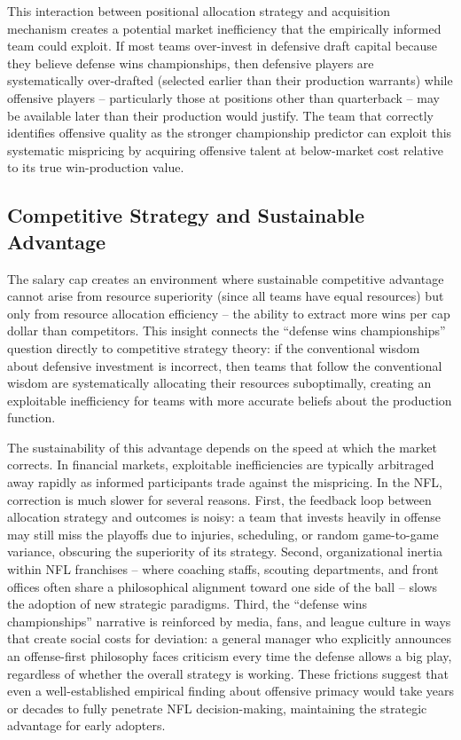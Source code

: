 This interaction between positional allocation strategy and acquisition mechanism creates a potential market inefficiency that the empirically informed team could exploit. If most teams over-invest in defensive draft capital because they believe defense wins championships, then defensive players are systematically over-drafted (selected earlier than their production warrants) while offensive players  -- particularly those at positions other than quarterback  -- may be available later than their production would justify. The team that correctly identifies offensive quality as the stronger championship predictor can exploit this systematic mispricing by acquiring offensive talent at below-market cost relative to its true win-production value.

\subsection{Competitive Strategy and Sustainable Advantage}
\label{sec:competitive-strategy}

The salary cap creates an environment where sustainable competitive advantage cannot arise from resource superiority (since all teams have equal resources) but only from resource allocation efficiency  -- the ability to extract more wins per cap dollar than competitors. This insight connects the ``defense wins championships'' question directly to competitive strategy theory: if the conventional wisdom about defensive investment is incorrect, then teams that follow the conventional wisdom are systematically allocating their resources suboptimally, creating an exploitable inefficiency for teams with more accurate beliefs about the production function.

The sustainability of this advantage depends on the speed at which the market corrects. In financial markets, exploitable inefficiencies are typically arbitraged away rapidly as informed participants trade against the mispricing. In the NFL, correction is much slower for several reasons. First, the feedback loop between allocation strategy and outcomes is noisy: a team that invests heavily in offense may still miss the playoffs due to injuries, scheduling, or random game-to-game variance, obscuring the superiority of its strategy. Second, organizational inertia within NFL franchises  -- where coaching staffs, scouting departments, and front offices often share a philosophical alignment toward one side of the ball  -- slows the adoption of new strategic paradigms. Third, the ``defense wins championships'' narrative is reinforced by media, fans, and league culture in ways that create social costs for deviation: a general manager who explicitly announces an offense-first philosophy faces criticism every time the defense allows a big play, regardless of whether the overall strategy is working. These frictions suggest that even a well-established empirical finding about offensive primacy would take years or decades to fully penetrate NFL decision-making, maintaining the strategic advantage for early adopters.

